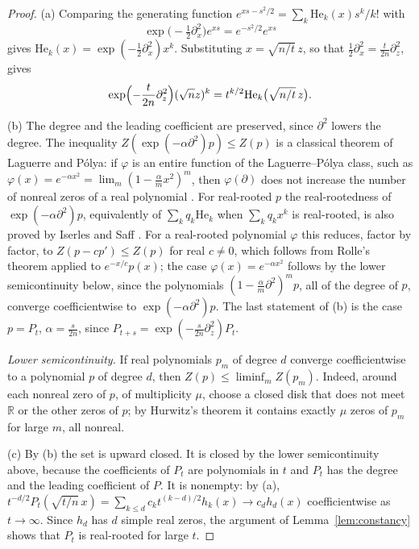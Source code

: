 \documentclass[11pt]{amsart}
\theoremstyle{definition}
\theoremstyle{remark}
\numberwithin{equation}{section}
\newcommand{\R}{\mathbb{R}}
\newcommand{\He}{\mathrm{He}}
\begin{document}
\begin{proof}
(a) Comparing the generating function $e^{xs-s^2/2}=\sum_k\He_k(x)s^k/k!$ with
\[
\exp\bigl(-\tfrac12\partial_x^2\bigr)e^{xs}=e^{-s^2/2}e^{xs}
\]
gives $\He_k(x)=\exp(-\frac12\partial_x^2)x^k$. Substituting $x=\sqrt{n/t}\,z$, so that $\frac12\partial_x^2=\frac t{2n}\partial_z^2$, gives
\[
\exp\Bigl(-\frac t{2n}\partial_z^2\Bigr)(\sqrt nz)^k=t^{k/2}\He_k\bigl(\sqrt{n/t}\,z\bigr).
\]

(b) The degree and the leading coefficient are preserved, since $\partial^2$ lowers the degree. The inequality $Z(\exp(-\alpha\partial^2)p)\le Z(p)$ is a classical theorem of Laguerre and P\'olya: if $\varphi$ is an entire function of the Laguerre--P\'olya class, such as $\varphi(x)=e^{-\alpha x^2}=\lim_m(1-\frac\alpha mx^2)^m$, then $\varphi(\partial)$ does not increase the number of nonreal zeros of a real polynomial \cite{Ob}. For real-rooted $p$ the real-rootedness of $\exp(-\alpha\partial^2)p$, equivalently of $\sum_kq_k\He_k$ when $\sum_kq_kx^k$ is real-rooted, is also proved by Iserles and Saff \cite{IS}.
For a real-rooted polynomial $\varphi$ this reduces, factor by factor, to $Z(p-cp')\le Z(p)$ for real $c\ne0$, which follows from Rolle's theorem applied to $e^{-x/c}p(x)$; the case $\varphi(x)=e^{-\alpha x^2}$ follows by the lower semicontinuity below, since the polynomials $(1-\frac\alpha m\partial^2)^mp$, all of the degree of $p$, converge coefficientwise to $\exp(-\alpha\partial^2)p$. The last statement of (b) is the case $p=P_t$, $\alpha=\frac s{2n}$, since $P_{t+s}=\exp(-\frac s{2n}\partial_z^2)P_t$.

\emph{Lower semicontinuity.} If real polynomials $p_m$ of degree $d$ converge coefficientwise to a polynomial $p$ of degree $d$, then $Z(p)\le\liminf_mZ(p_m)$. Indeed, around each nonreal zero of $p$, of multiplicity $\mu$, choose a closed disk that does not meet $\R$ or the other zeros of $p$; by Hurwitz's theorem it contains exactly $\mu$ zeros of $p_m$ for large $m$, all nonreal.

(c) By (b) the set is upward closed. It is closed by the lower semicontinuity above, because the coefficients of $P_t$ are polynomials in $t$ and $P_t$ has the degree and the leading coefficient of $P$. It is nonempty: by (a), $t^{-d/2}P_t(\sqrt{t/n}\,x)=\sum_{k\le d}c_kt^{(k-d)/2}h_k(x)\to c_dh_d(x)$ coefficientwise as $t\to\infty$. Since $h_d$ has $d$ simple real zeros, the argument of Lemma~\ref{lem:constancy} shows that $P_t$ is real-rooted for large $t$.
\end{proof}
\end{document}
